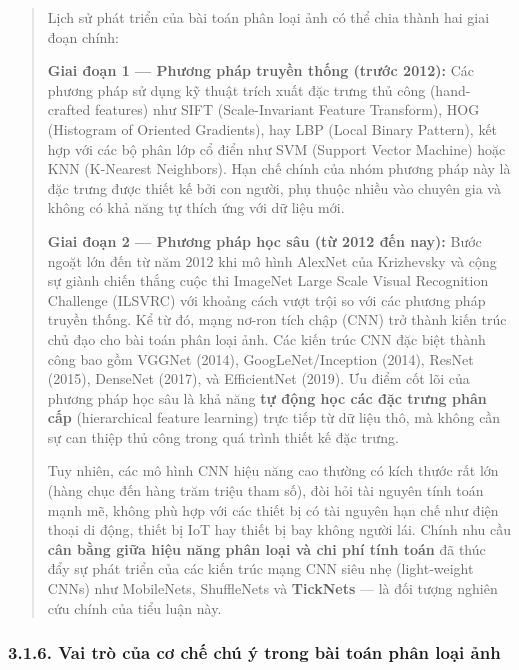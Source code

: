 \documentclass[
]{article}
\begin{document}
\begin{quote}
Lịch sử phát triển của bài toán phân loại ảnh có thể chia thành hai giai đoạn chính:

\textbf{Giai đoạn 1 --- Phương pháp truyền thống (trước 2012):} Các phương pháp sử dụng kỹ thuật trích xuất đặc trưng thủ công (hand-crafted features) như SIFT (Scale-Invariant Feature Transform), HOG (Histogram of Oriented Gradients), hay LBP (Local Binary Pattern), kết hợp với các bộ phân lớp cổ điển như SVM (Support Vector Machine) hoặc KNN (K-Nearest Neighbors). Hạn chế chính của nhóm phương pháp này là đặc trưng được thiết kế bởi con người, phụ thuộc nhiều vào chuyên gia và không có khả năng tự thích ứng với dữ liệu mới.

\textbf{Giai đoạn 2 --- Phương pháp học sâu (từ 2012 đến nay):} Bước ngoặt lớn đến từ năm 2012 khi mô hình AlexNet của Krizhevsky và cộng sự giành chiến thắng cuộc thi ImageNet Large Scale Visual Recognition Challenge (ILSVRC) với khoảng cách vượt trội so với các phương pháp truyền thống. Kể từ đó, mạng nơ-ron tích chập (CNN) trở thành kiến trúc chủ đạo cho bài toán phân loại ảnh. Các kiến trúc CNN đặc biệt thành công bao gồm VGGNet (2014), GoogLeNet/Inception (2014), ResNet (2015), DenseNet (2017), và EfficientNet (2019). Ưu điểm cốt lõi của phương pháp học sâu là khả năng \textbf{tự động học các đặc trưng phân cấp} (hierarchical feature learning) trực tiếp từ dữ liệu thô, mà không cần sự can thiệp thủ công trong quá trình thiết kế đặc trưng.

Tuy nhiên, các mô hình CNN hiệu năng cao thường có kích thước rất lớn (hàng chục đến hàng trăm triệu tham số), đòi hỏi tài nguyên tính toán mạnh mẽ, không phù hợp với các thiết bị có tài nguyên hạn chế như điện thoại di động, thiết bị IoT hay thiết bị bay không người lái. Chính nhu cầu \textbf{cân bằng giữa hiệu năng phân loại và chi phí tính toán} đã thúc đẩy sự phát triển của các kiến trúc mạng CNN siêu nhẹ (light-weight CNNs) như MobileNets, ShuffleNets và \textbf{TickNets} --- là đối tượng nghiên cứu chính của tiểu luận này.
\end{quote}

\subsubsection{3.1.6. Vai trò của cơ chế chú ý trong bài toán phân loại ảnh}
\end{document}
